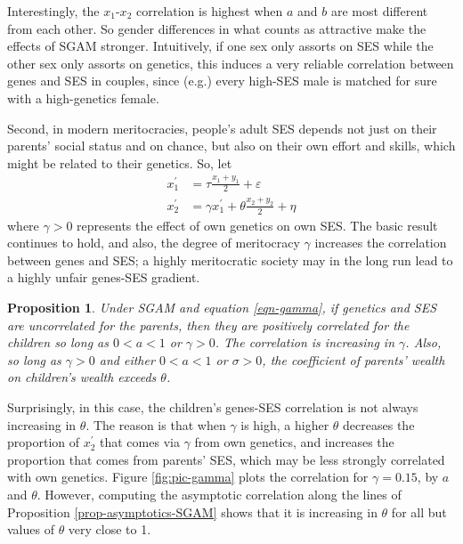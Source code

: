 \documentclass[
]{article}
\newtheorem{proposition}{Proposition}
\theoremstyle{definition}
\theoremstyle{definition}
\theoremstyle{definition}
\theoremstyle{definition}
\theoremstyle{remark}
\begin{document}
Interestingly, the \(x_1\)-\(x_2\) correlation is highest when \(a\) and \(b\) are most
different from each other. So gender differences in what counts as attractive
make the effects of SGAM stronger. Intuitively, if one sex only assorts on
SES while the other sex only assorts on genetics, this induces a very reliable
correlation between genes and SES in couples, since (e.g.) every high-SES male
is matched for sure with a high-genetics female.

Second, in modern meritocracies, people's adult SES depends not just
on their parents' social status and on chance, but also on their own effort and
skills, which might be related to their genetics. So, let
\begin{align}
x^\prime_1 &= \tau \frac{x_{1} + y_{1}}{2} + \varepsilon   \nonumber \\
x^\prime_2 &= \gamma x^\prime_1 + \theta \frac{x_{2}+y_{2}}{2}+\eta \label{eqn-gamma}
\end{align}
where \(\gamma > 0\) represents the effect of own genetics on own SES.
The basic result continues to hold, and also, the degree of meritocracy \(\gamma\)
increases the correlation between genes and SES; a highly meritocratic
society may in the long run lead to a highly unfair genes-SES gradient.

\begin{proposition}\label{prop-gamma}
Under SGAM and equation \eqref{eqn-gamma}, if genetics and SES are 
uncorrelated for the parents, then they
are positively correlated for the children so long as $0 < a < 1$ or
$\gamma > 0$. The correlation is increasing in $\gamma$. Also, so 
long as $\gamma > 0$ and either $0 < a < 1$ or $\sigma > 0$, the coefficient 
of parents' wealth on children's wealth exceeds $\theta$.
\end{proposition}

Surprisingly, in this case, the children's genes-SES correlation is not always
increasing in \(\theta\). The reason is that when \(\gamma\) is high, a higher
\(\theta\) decreases the proportion of \(x^\prime_2\) that comes via \(\gamma\) from
own genetics, and increases the proportion that comes from parents' SES, which
may be less strongly correlated with own genetics. Figure \ref{fig:pic-gamma}
plots the correlation for \(\gamma = 0.15\), by \(a\) and \(\theta\). However,
computing the asymptotic correlation along the lines of Proposition \ref{prop-asymptotics-SGAM} shows that it is increasing in \(\theta\) for
all but values of \(\theta\) very close to 1.
\end{document}
